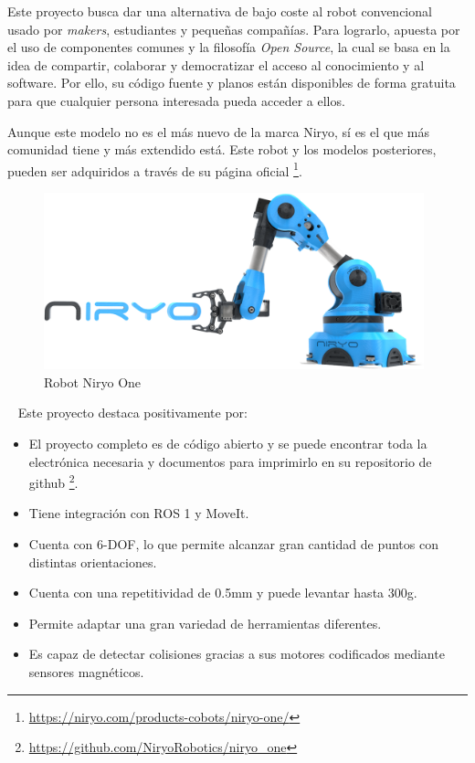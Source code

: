    Este proyecto busca dar una alternativa de bajo coste al robot convencional usado por \textit{makers}, estudiantes y 
    pequeñas compañías. Para lograrlo, apuesta por el uso de componentes comunes y la filosofía \textit{Open Source}, la cual se basa en la 
    idea de compartir, colaborar y democratizar el acceso al conocimiento y al software. Por ello, su código fuente y planos están disponibles 
    de forma gratuita para que cualquier persona interesada pueda acceder a ellos.

    Aunque este modelo no es el más nuevo de la marca Niryo, sí es el que más comunidad tiene y más extendido está.
    Este robot y los modelos posteriores, pueden ser adquiridos a través de su página oficial \footnote{\url{https://niryo.com/products-cobots/niryo-one/}}.
    \\
    \begin{figure} [ht!]
        \begin{center}
          \includegraphics[width=11cm]{figs/niryo.png}
        \end{center}
        \caption{Robot Niryo One}
        \label{fig:niryo}
    \end{figure}\ 
    \newpage
    Este proyecto destaca positivamente por:
    \begin{itemize}
    \item El proyecto completo es de código abierto y se puede encontrar toda la electrónica necesaria y documentos para imprimirlo en 
    su repositorio de github \footnote{\url{https://github.com/NiryoRobotics/niryo_one}}.
    \item Tiene integración con ROS 1 y MoveIt.
    \item Cuenta con 6-DOF, lo que permite alcanzar gran cantidad de puntos con distintas orientaciones.
    \item Cuenta con una repetitividad de 0.5mm y puede levantar hasta 300g.
    \item Permite adaptar una gran variedad de herramientas diferentes.
    \item Es capaz de detectar colisiones gracias a sus motores codificados mediante sensores magnéticos.
    \end{itemize}
